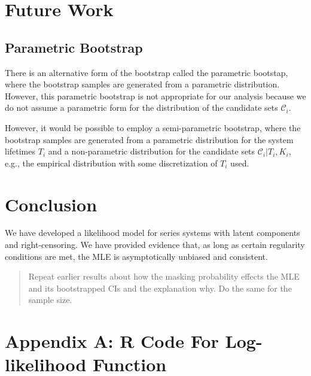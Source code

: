 \documentclass[
]{article}
\begin{document}
\hypertarget{future-work}{%
\section{Future Work}\label{future-work}}

\hypertarget{parametric-bootstrap}{%
\subsection{Parametric Bootstrap}\label{parametric-bootstrap}}

There is an alternative form of the bootstrap called the parametric
bootstap, where the bootstrap samples are generated from a parametric
distribution. However, this parametric bootstrap is not appropriate for
our analysis because we do not assume a parametric form for the
distribution of the candidate sets \(\mathcal{C}_i\).

However, it would be possible to employ a semi-parametric bootstrap,
where the bootstrap samples are generated from a parametric distribution
for the system lifetimes \(T_i\) and a non-parametric distribution for
the candidate sets \(\mathcal{C}_i | T_i, K_i\), e.g., the empirical
distribution with some discretization of \(T_i\) used.

\hypertarget{conclusion}{%
\section{Conclusion}\label{conclusion}}

We have developed a likelihood model for series systems with latent
components and right-censoring. We have provided evidence that, as long
as certain regularity conditions are met, the MLE is asymptotically
unbiased and consistent.

\begin{quote}
Repeat earlier results about how the masking probability effects the MLE
and its bootstrapped CIs and the explanation why. Do the same for the
sample size.
\end{quote}

\hypertarget{appendix-a-r-code-for-log-likelihood-function}{%
\section*{Appendix A: R Code For Log-likelihood
Function}\label{appendix-a-r-code-for-log-likelihood-function}}
\end{document}
